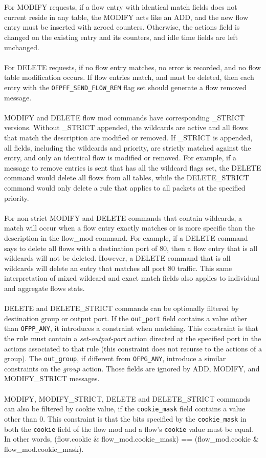 \documentclass[10pt]{article}
\begin{document}
\\\\
For MODIFY requests, if a flow entry with identical match fields does not current reside in any table, the MODIFY acts like an ADD, and the new flow entry must be inserted with zeroed counters.  Otherwise, the actions field is changed on the existing entry and its counters, and idle time fields are left unchanged.
\\\\
For DELETE requests, if no flow entry matches, no error is recorded, and no flow table modification occurs.  If flow entries match, and must be deleted, then each entry with the \verb|OFPFF_SEND_FLOW_REM| flag set should generate a flow removed message.
\\\\
MODIFY and DELETE flow mod commands have corresponding \_STRICT versions.   Without \_STRICT appended, the wildcards are active and all flows that match the description are modified or removed.  If \_STRICT is appended, all fields, including the wildcards and priority, are strictly matched against the entry, and only an identical flow is modified or removed.  For example, if a message to remove entries is sent that has all the wildcard flags set, the DELETE command would delete all flows from all tables, while the DELETE\_STRICT command would only delete a rule that applies to all packets at the specified priority.
\\\\
For non-strict MODIFY and DELETE commands that contain wildcards, a match will occur when a flow entry exactly matches or is more specific than the description in the flow\_mod command. For example, if a DELETE command says to delete all flows with a destination port of 80, then a flow entry that is all wildcards will not be deleted. However, a DELETE command that is all wildcards will delete an entry that matches all port 80 traffic.  This same interpretation of mixed wildcard and exact match fields also applies to individual and aggregate flows stats.  
\\\\
DELETE and DELETE\_STRICT commands can be optionally filtered by destination group or output port.  If the \verb|out_port| field contains a value other than \verb|OFPP_ANY|, it introduces a constraint when matching.  This constraint is that the rule must contain a \emph{set-output-port} action directed at the specified port in the actions associated to that rule (this constraint does not recurse to the actions of a group).  The \verb|out_group|, if different from \verb|OFPG_ANY|, introduce a similar constraints on the \emph{group} action. Those fields are ignored by ADD, MODIFY, and MODIFY\_STRICT messages.
\\\\
MODIFY, MODIFY\_STRICT, DELETE and DELETE\_STRICT commands can also be filtered by cookie value, if the \verb|cookie_mask| field contains a value other than 0. This constraint is that the bits specified by the \verb|cookie_mask| in both the \verb|cookie| field of the flow mod and a flow's \verb|cookie| value must be equal. In other words, (flow.cookie \& flow\_mod.cookie\_mask) == (flow\_mod.cookie \& flow\_mod.cookie\_mask).
\end{document}
